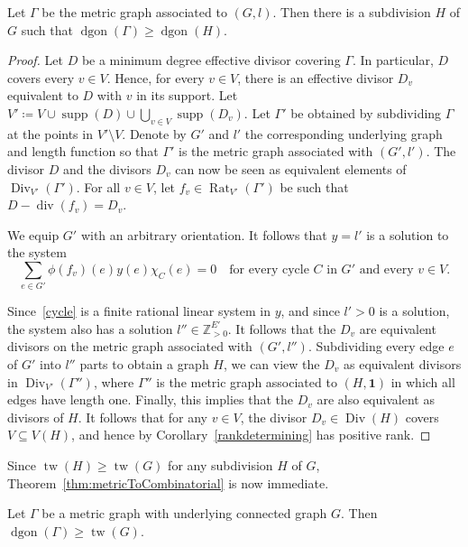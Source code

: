 \documentclass[ALCO,ThmDefs,Unicode,epreuves]{cedram}
\newcommand{\Z}{\ensuremath{\mathbb{Z}}}
\newcommand{\one}{\ensuremath{\mathbf{1}}}
\DeclareMathOperator{\tw}{tw}
\DeclareMathOperator{\Div}{Div}
\DeclareMathOperator{\Rat}{Rat}
\DeclareMathOperator{\todiv}{div}
\DeclareMathOperator{\dgon}{dgon}
\DeclareMathOperator{\supp}{supp}
\begin{document}
\begin{theorem}\label{thm:metricToCombinatorial}
Let $\Gamma$ be the metric graph associated to $(G,l)$. Then there is a subdivision $H$ of $G$ such that $\dgon(\Gamma)\geq \dgon(H)$. 
\end{theorem}
\begin{proof}
Let $D$ be a minimum degree effective divisor covering $\Gamma$. In particular, $D$ covers every $v\in V$. Hence, for every $v\in V$, there is an effective divisor $D_v$ equivalent to $D$ with $v$ in its support. Let $V'\coloneqq V\cup \supp(D)\cup\bigcup_{v\in V}\supp(D_v)$. Let $\Gamma'$ be obtained by subdividing $\Gamma$ at the points in $V'\setminus V$. Denote by $G'$ and $l'$ the corresponding underlying graph and length function so that $\Gamma'$ is the metric graph associated with $(G',l')$. The divisor $D$ and the divisors $D_v$ can now be seen as equivalent elements of $\Div_{V'}(\Gamma')$. For all $v\in V$, let $f_v\in \Rat_{V'}(\Gamma')$ be such that $D-\todiv(f_v)=D_v$. 

We equip $G'$ with an arbitrary orientation. It follows that $y=l'$ is a solution to the system 
\begin{equation}\label{cycle}
\sum_{e\in G'}\phi(f_v)(e)y(e)\chi_C(e)=0\quad \text{for every cycle $C$ in $G'$ and every $v\in V$}.
\end{equation} 

Since~\eqref{cycle} is a finite rational linear system in $y$, and since $l'>0$ is a solution, the system also has a solution $l''\in \Z_{>0}^{E'}$. It follows that the $D_v$ are equivalent divisors on the metric graph associated with $(G', l'')$. Subdividing every edge $e$ of $G'$ into $l''$ parts to obtain a graph $H$, we can view the $D_v$ as equivalent divisors in $\Div_{V'}(\Gamma'')$, where $\Gamma''$ is the metric graph associated to $(H,\one)$ in which all edges have length one. Finally, this implies that the $D_v$ are also equivalent as divisors of $H$. It follows that for any $v\in V$, the divisor $D_v\in \Div(H)$ covers $V\subseteq V(H)$, and hence by Corollary~\ref{rankdetermining} has positive rank.
\end{proof}
Since $\tw(H)\geq \tw(G)$ for any subdivision $H$ of $G$, Theorem~\ref{thm:metricToCombinatorial} is now immediate.
\begin{coro}\label{lem:LBmetric}
Let $\Gamma$ be a metric graph with underlying connected graph $G$. Then $\dgon(\Gamma)\geq \tw(G)$.
\end{coro}
 
\end{document}
